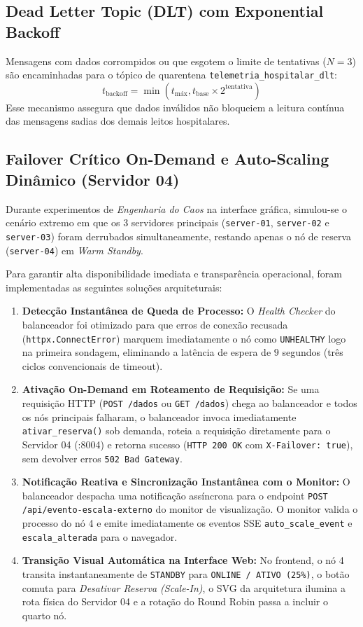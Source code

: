 \documentclass[11pt,a4paper]{article}
\begin{document}
\subsection{Dead Letter Topic (DLT) com Exponential Backoff}
Mensagens com dados corrompidos ou que esgotem o limite de tentativas ($N=3$) são encaminhadas para o tópico de quarentena \texttt{telemetria\_hospitalar\_dlt}:
\begin{equation}
    t_{\text{backoff}} = \min(t_{\text{máx}}, t_{\text{base}} \times 2^{\text{tentativa}})
\end{equation}
Esse mecanismo assegura que dados inválidos não bloqueiem a leitura contínua das mensagens sadias dos demais leitos hospitalares.

\subsection{Failover Crítico On-Demand e Auto-Scaling Dinâmico (Servidor 04)}
Durante experimentos de \textit{Engenharia do Caos} na interface gráfica, simulou-se o cenário extremo em que os $3$ servidores principais (\texttt{server-01}, \texttt{server-02} e \texttt{server-03}) foram derrubados simultaneamente, restando apenas o nó de reserva (\texttt{server-04}) em \textit{Warm Standby}.

Para garantir alta disponibilidade imediata e transparência operacional, foram implementadas as seguintes soluções arquiteturais:
\begin{enumerate}
    \item \textbf{Detecção Instantânea de Queda de Processo:} O \textit{Health Checker} do balanceador foi otimizado para que erros de conexão recusada (\texttt{httpx.ConnectError}) marquem imediatamente o nó como \texttt{UNHEALTHY} logo na primeira sondagem, eliminando a latência de espera de $9$ segundos (três ciclos convencionais de timeout).
    \item \textbf{Ativação On-Demand em Roteamento de Requisição:} Se uma requisição HTTP (\texttt{POST /dados} ou \texttt{GET /dados}) chega ao balanceador e todos os nós principais falharam, o balanceador invoca imediatamente \texttt{ativar\_reserva()} sob demanda, roteia a requisição diretamente para o Servidor 04 (:8004) e retorna sucesso (\texttt{HTTP 200 OK} com \texttt{X-Failover: true}), sem devolver erros \texttt{502 Bad Gateway}.
    \item \textbf{Notificação Reativa e Sincronização Instantânea com o Monitor:} O balanceador despacha uma notificação assíncrona para o endpoint \texttt{POST /api/evento-escala-externo} do monitor de visualização. O monitor valida o processo do nó 4 e emite imediatamente os eventos SSE \texttt{auto\_scale\_event} e \texttt{escala\_alterada} para o navegador.
    \item \textbf{Transição Visual Automática na Interface Web:} No frontend, o nó 4 transita instantaneamente de \texttt{STANDBY} para \texttt{ONLINE / ATIVO (25\%)}, o botão comuta para \textit{Desativar Reserva (Scale-In)}, o SVG da arquitetura ilumina a rota física do Servidor 04 e a rotação do Round Robin passa a incluir o quarto nó.
\end{enumerate}
\end{document}
